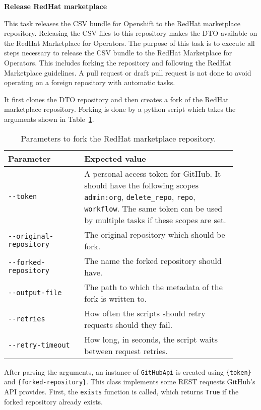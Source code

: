 \textbf{Release RedHat marketplace}

This task releases the CSV bundle for Openshift to the RedHat marketplace repository.
Releasing the CSV files to this repository makes the DTO available on the RedHat Marketplace for Operators.
The purpose of this task is to execute all steps necessary to release the CSV bundle to the RedHat Marketplace for Operators.
This includes forking the repository and following the RedHat Marketplace guidelines.
A pull request or draft pull request is not done to avoid operating on a foreign repository with automatic tasks.

It first clones the DTO repository and then creates a fork of the RedHat marketplace repository.
Forking is done by a python script which takes the arguments shown in Table~\ref{tab:parameters-to-fork-the-redhat-marketplace-repository}.

\begin{table}[H]
    \centering
    \caption{Parameters to fork the RedHat marketplace repository.}
    \label{tab:parameters-to-fork-the-redhat-marketplace-repository}
    \begin{tabular}{p{0.3\linewidth}|p{0.6\linewidth}}
        Parameter & Expected value \\
        \hline
        \verb|--token| & A personal access token for GitHub.
            It should have the following scopes \verb|admin:org|, \verb|delete_repo|, \verb|repo|, \verb|workflow|.
            The same token can be used by multiple tasks if these scopes are set. \\
        \verb|--original-repository| & The original repository which should be fork. \\
        \verb|--forked-repository| & The name the forked repository should have. \\
        \verb|--output-file| & The path to which the metadata of the fork is written to. \\
        \verb|--retries| & How often the scripts should retry requests should they fail. \\
        \verb|--retry-timeout| & How long, in seconds, the script waits between request retries. \\
    \end{tabular}
\end{table}

After parsing the arguments, an instance of \verb|GitHubApi| is created using \verb|{token}| and \verb|{forked-repository}|.
This class implements some REST requests GitHub's API provides.
First, the \verb|exists| function is called, which returns \verb|True| if the forked repository already exists.

